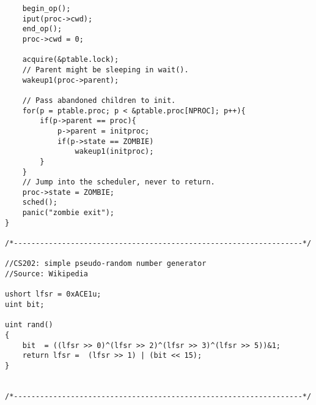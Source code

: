\documentclass[a4paper, 10pt]{article}
\begin{document}
\begin{lstlisting}
    begin_op();
    iput(proc->cwd);
    end_op();
    proc->cwd = 0;

    acquire(&ptable.lock);
    // Parent might be sleeping in wait().
    wakeup1(proc->parent);

    // Pass abandoned children to init.
    for(p = ptable.proc; p < &ptable.proc[NPROC]; p++){
        if(p->parent == proc){
            p->parent = initproc;
            if(p->state == ZOMBIE)
                wakeup1(initproc);
        }
    }
    // Jump into the scheduler, never to return.
    proc->state = ZOMBIE;
    sched();
    panic("zombie exit");
}

/*------------------------------------------------------------------*/

//CS202: simple pseudo-random number generator
//Source: Wikipedia

ushort lfsr = 0xACE1u;
uint bit;

uint rand()
{
    bit  = ((lfsr >> 0)^(lfsr >> 2)^(lfsr >> 3)^(lfsr >> 5))&1;
    return lfsr =  (lfsr >> 1) | (bit << 15);
}


/*------------------------------------------------------------------*/

\end{lstlisting}
\end{document}
